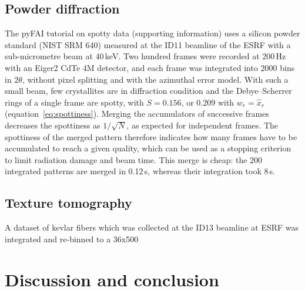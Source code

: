 \documentclass{iucrjournals}
\newcommand{\mean}[1]{\widehat{#1}}
\begin{document}

\subsection{Powder diffraction}
\label{sec:powder}
The pyFAI tutorial on spotty data (supporting information) uses a silicon powder standard (NIST SRM 640) measured at the ID11 beamline of the ESRF with a sub-micrometre beam at 40\,keV.
Two hundred frames were recorded at 200\,Hz with an Eiger2 CdTe 4M detector, and each frame was integrated into 2000 bins in $2\theta$, without pixel splitting and with the azimuthal error model.
With such a small beam, few crystallites are in diffraction condition and the Debye--Scherrer rings of a single frame are spotty, with $S=0.156$, or 0.209 with $w_r=\mean{x}_r$ (equation~\ref{eq:spottiness}).
Merging the accumulators of successive frames decreases the spottiness as $1/\sqrt{N}$, as expected for independent frames.
The spottiness of the merged pattern therefore indicates how many frames have to be accumulated to reach a given quality, which can be used as a stopping criterion to limit radiation damage and beam time.
This merge is cheap: the 200 integrated patterns are merged in 0.12\,s, whereas their integration took 8\,s.

\subsection{Texture tomography}
\label{sec:texture-tomo}
A dataset of kevlar fibers which was collected at the ID13 beamline at ESRF was integrated and re-binned to a 36x500

\section{Discussion and conclusion}
\label{sec:discussion}
\end{document}

